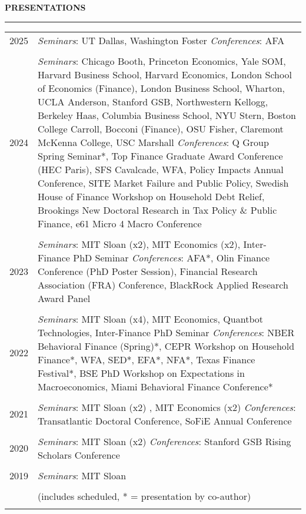 \documentclass[a4paper, 10pt]{article}
\newcommand{\cvsec}[1]
{
	\needspace{2\baselineskip}
	\noindent \textbf{#1}
	
	\vspace{2pt}
	
	\hrule
	
	\bigskip
}
\newcommand{\cvitem}[2]{#1 & #2 \\ & \\}
\newenvironment{cvchrono}[1]
{
	\cvsec{#1}
	\begin{tabu} to \linewidth {X[1,l]X[6,l]} 
}
{
	\end{tabu}
}
\begin{document}
\begin{cvchrono}{PRESENTATIONS}
	\cvitem{2025}{\textit{Seminars}: UT Dallas, Washington Foster \newline \textit{Conferences}: AFA}
	\cvitem{2024}{\textit{Seminars}: Chicago Booth, Princeton Economics, Yale SOM, Harvard Business School, Harvard Economics, London School of Economics (Finance), London Business School, Wharton, UCLA Anderson, Stanford GSB, Northwestern Kellogg, Berkeley Haas, Columbia Business School, NYU Stern, Boston College Carroll, Bocconi (Finance), OSU Fisher, Claremont McKenna College, USC Marshall \newline \textit{Conferences}: Q Group Spring Seminar*, Top Finance Graduate Award Conference (HEC Paris), SFS Cavalcade, WFA, Policy Impacts Annual Conference, SITE Market Failure and Public Policy, Swedish House of Finance Workshop on Household Debt Relief, Brookings New Doctoral Research in Tax Policy \& Public Finance, e61 Micro 4 Macro Conference}
	\cvitem{2023}{\textit{Seminars}: MIT Sloan (x2), MIT Economics (x2), Inter-Finance PhD Seminar \newline \textit{Conferences}: AFA*, Olin Finance Conference (PhD Poster Session), Financial Research Association (FRA) Conference, BlackRock Applied Research Award Panel}
	\cvitem{2022}{\textit{Seminars}: MIT Sloan (x4), MIT Economics, Quantbot Technologies, Inter-Finance PhD Seminar \newline \textit{Conferences}: NBER Behavioral Finance (Spring)*, CEPR Workshop on Household Finance*, WFA, SED*, EFA*, NFA*, Texas Finance Festival*, BSE PhD Workshop on Expectations in Macroeconomics, Miami Behavioral Finance Conference*}
	\cvitem{2021}{\textit{Seminars}: MIT Sloan (x2) , MIT Economics (x2) \newline \textit{Conferences}: Transatlantic Doctoral Conference, SoFiE Annual Conference}
	\cvitem{2020}{\textit{Seminars}: MIT Sloan (x2) \newline \textit{Conferences}: Stanford GSB Rising Scholars Conference}
	\cvitem{2019}{\textit{Seminars}: MIT Sloan}
	\cvitem{}{(includes scheduled, * = presentation by co-author)}
\end{cvchrono}

\end{document}
